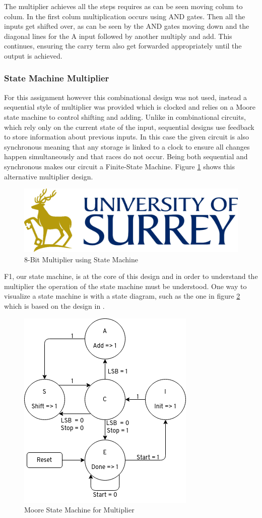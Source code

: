 \documentclass[11pt]{article}
\begin{document}
The multiplier achieves all the steps requires as can be seen moving colum to colum. 
In the first colum multiplication occurs using AND gates.
Then all the inputs get shifted over, as can be seen by the AND gates moving down and the diagonal lines for the A input followed by another multiply and add.
This continues, ensuring the carry term also get forwarded appropriately until the output is achieved.

\subsubsection{State Machine Multiplier}

For this assignment however this combinational design was not used, 
instead a sequential style of multiplier was provided which is clocked and relies on a Moore state machine to control shifting and adding.
Unlike in combinational circuits, which rely only on the current state of the input, sequential designs use feedback to store information about previous inputs\cite{dally}.
In this case the given circuit is also synchronous meaning that any storage is linked to a clock to ensure all changes happen simultaneously and that races do not occur.
Being both sequential and synchronous makes our circuit a Finite-State Machine\cite{dally}.
Figure \ref{fig:4bit_mult} shows this alternative multiplier design. 

\begin{figure}[H]        
    \centering
    \includegraphics[width=.5\textwidth]{Logo.png}
    \caption{8-Bit Multiplier using State Machine}
    \label{fig:4bit_mult}
\end{figure} 

F1, our state machine, is at the core of this design and in order to understand the multiplier the operation of the state machine must be understood.
One way to visualize a state machine is with a state diagram, such as the one in figure \ref{fig:msm} which is based on the design in \cite{smith1997application}.

\begin{figure}[H]        
    \centering
    \includegraphics[width=.5\textwidth]{StateMachine.png}
    \caption{Moore State Machine for Multiplier}
    \label{fig:msm}
\end{figure} 
\end{document}
